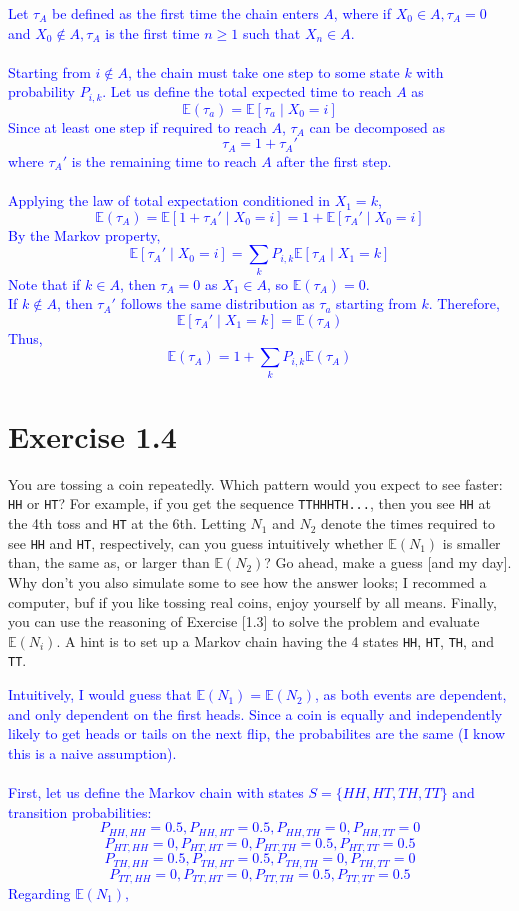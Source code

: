 \documentclass{article}
\begin{document}
\textcolor{blue}{Let $\tau_A$ be defined as the first time the chain enters $A$, where if $X_0\in A, \tau_A=0$ and $X_0\notin A, \tau_A$ is the first time $n \geq 1$ such that $X_n \in A$. \\ \\ Starting from $i\notin A$, the chain must take one step to some state $k$ with probability $P_{i,k}$. Let us define the total expected time to reach $A$ as $$\mathbb{E}(\tau_a)=\mathbb{E}[\tau_a \mid X_0=i]$$
Since at least one step if required to reach $A$, $\tau_A$ can be decomposed as $$\tau_A = 1 + \tau_A'$$ where $\tau_A'$ is the remaining time to reach $A$ after the first step. \\ \\
Applying the law of total expectation conditioned in $X_1=k$, $$\mathbb{E}(\tau_A)=\mathbb{E}[1+\tau_A' \mid X_0=i] = 1 + \mathbb{E}[\tau_A' \mid X_0 =i]$$
By the Markov property, $$\mathbb{E}[\tau_A' \mid  X_0=i] = \sum_k P_{i,k}\mathbb{E}[\tau_A \mid X_1=k]$$
Note that if $k\in A$, then $\tau_A=0$ as $X_1 \in A$, so $\mathbb{E}(\tau_A)=0$. \\ 
If $k\notin A$, then $\tau_A'$ follows the same distribution as $\tau_a$ starting from $k$. Therefore, $$\mathbb{E}[\tau_A' \mid X_1= k]=\mathbb{E}(\tau_A)$$
Thus, $$\mathbb{E}(\tau_A)=1+\sum_k P_{i,k}\mathbb{E}(\tau_A)$$}

\section*{Exercise 1.4} 
You are tossing a coin repeatedly. Which
pattern would you expect to see faster: \texttt{HH} or \texttt{HT}?
For example, if you get the sequence \texttt{TTHHHTH...}, then you
see \texttt{HH} at the 4th toss and \texttt{HT} at the 6th. Letting
$N_1$ and $N_2$ denote the times required to see \texttt{HH} and
\texttt{HT}, respectively, can you guess intuitively whether $\mathbb{E}(N_1)$
is smaller than, the same as, or larger than $\mathbb{E}(N_2)$? Go ahead, make
a guess [and my day]. Why don’t you also simulate some to see how the answer
looks; I recommed a computer, buf if you like tossing real coins, enjoy yourself by all means. Finally, you can use the reasoning of Exercise [1.3] to solve the
problem and evaluate $\mathbb{E}(N_i)$. A hint is to set up a Markov chain
having the 4 states \texttt{HH}, \texttt{HT}, \texttt{TH}, and
\texttt{TT}.

\textcolor{blue}{Intuitively, I would guess that $\mathbb{E}(N_1)=\mathbb{E}(N_2)$, as both events are dependent, and only dependent on the first heads. Since a coin is equally and independently likely to get heads or tails on the next flip, the probabilites are the same (I know this is a naive assumption). \\ \\ 
First, let us define the Markov chain with states $S=\{HH, HT, TH, TT\}$ and transition probabilities: $$P_{HH,HH}=0.5, P_{HH,HT}=0.5, P_{HH,TH}=0, P_{HH,TT}=0$$ $$P_{HT,HH}=0, P_{HT,HT}=0, P_{HT,TH}=0.5, P_{HT,TT}=0.5$$ $$P_{TH,HH}=0.5, P_{TH,HT}=0.5, P_{TH,TH}=0, P_{TH,TT}=0$$ $$P_{TT,HH}=0, P_{TT,HT}=0, P_{TT,TH}=0.5, P_{TT,TT}=0.5$$
Regarding $\mathbb{E}(N_1)$, }
\end{document}
